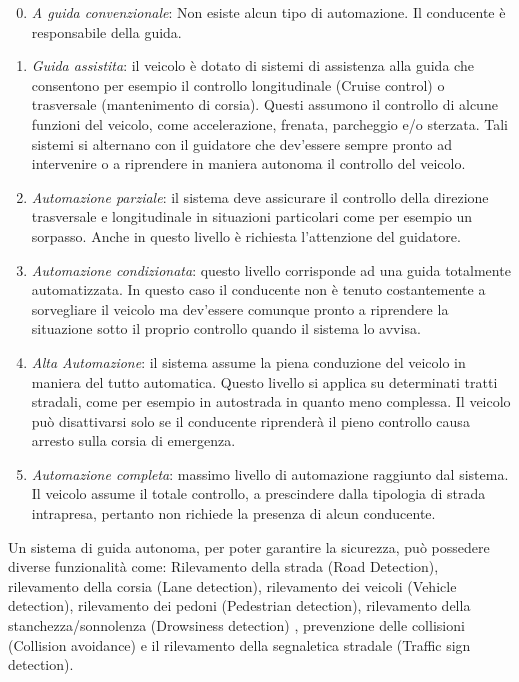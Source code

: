 \begin{enumerate}
    \setcounter{enumi}{-1}
    \item \emph{A guida convenzionale}:  Non esiste alcun tipo di automazione. Il 
    conducente è responsabile della guida.
    \item \emph{Guida assistita}: il veicolo è dotato di sistemi di assistenza alla guida 
    che consentono per esempio il controllo longitudinale (Cruise control) 
    o trasversale (mantenimento di corsia). Questi assumono il controllo 
    di alcune funzioni del veicolo, come accelerazione, frenata, parcheggio 
    e/o sterzata. Tali sistemi si alternano con il guidatore che dev'essere 
    sempre pronto ad intervenire o a riprendere in maniera autonoma il 
    controllo del veicolo.
    \item \emph{Automazione parziale}: il sistema deve assicurare il controllo della 
    direzione trasversale e longitudinale in situazioni particolari come per 
    esempio un sorpasso. Anche in questo livello è richiesta l'attenzione 
    del guidatore.
    \item \emph{Automazione condizionata}: questo livello corrisponde ad una guida 
    totalmente automatizzata. In questo caso il conducente non è tenuto 
    costantemente a sorvegliare il veicolo ma dev'essere comunque pronto 
    a riprendere la situazione sotto il proprio controllo quando il sistema 
    lo avvisa.
    \item \emph{Alta Automazione}: il sistema assume la piena conduzione del veicolo 
    in maniera del tutto automatica. Questo livello si applica su determinati 
    tratti stradali, come per esempio in autostrada in quanto meno 
    complessa. Il veicolo può disattivarsi solo se il conducente riprenderà 
    il pieno controllo causa arresto sulla corsia di emergenza. 
    \item \emph{Automazione completa}: massimo livello di automazione raggiunto 
    dal sistema. Il veicolo assume il totale controllo, a prescindere dalla 
    tipologia di strada intrapresa, pertanto non richiede la presenza 
    di alcun conducente.
\end{enumerate} 
Un sistema di guida autonoma, per poter garantire la sicurezza, può possedere 
diverse funzionalità come: Rilevamento della strada (Road Detection), 
rilevamento della corsia (Lane detection), rilevamento dei veicoli (Vehicle 
detection), rilevamento dei pedoni (Pedestrian detection), rilevamento della 
stanchezza/sonnolenza (Drowsiness detection) , prevenzione delle collisioni 
(Collision avoidance) e il rilevamento della segnaletica stradale (Traffic sign 
detection).

